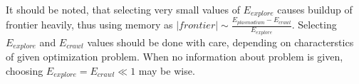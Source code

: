 It should be noted, that selecting very small values of $E_{explore}$ causes buildup of frontier heavily, thus using memory as $|frontier| \sim \frac{E_{plasmodium} - E_{crawl}}{E_{explore}}$. Selecting $E_{explore}$ and $E_{crawl}$ values should be done with care, depending on characterstics of given optimization problem. When no information about problem is given, choosing $E_{explore} = E_{crawl} \ll 1$ may be wise. 


